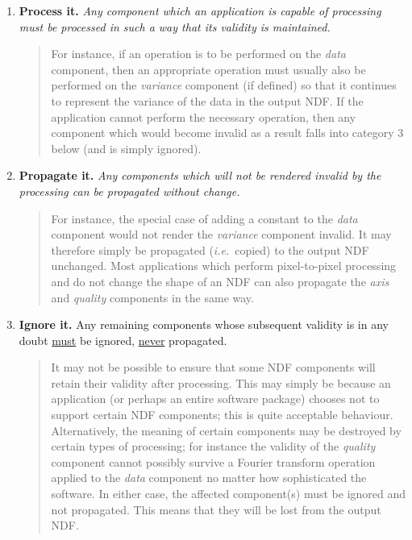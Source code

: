 \documentclass[twoside,11pt,nolof]{starlink}
\providecommand{\st}[1]{{\emph{#1}}}
\begin{document}
\begin{enumerate}

\item \textbf{Process it.}
\st{Any component which an application is capable of processing must be
processed in such a way that its validity is maintained.}

\small
\begin{quote}
For instance, if an operation is to be performed on the \st{data\/} component,
then an appropriate operation must usually also be performed on the
\st{variance\/} component (if defined) so that it continues to
represent the variance
of the data in the output NDF.
If the application cannot perform the necessary operation, then any
component which would become invalid as a result falls into category 3
below (and is simply ignored).
\end{quote}
\normalsize

\item \textbf{Propagate it.}
\st{Any components which will not be rendered invalid by the processing
can be propagated without change.}

\small
\begin{quote}
For instance, the special case of adding a constant to the \st{data\/} component
would not render the \st{variance\/} component invalid.
It may therefore simply be propagated (\st{i.e.}\ copied) to the output NDF
unchanged.
Most applications which perform pixel-to-pixel processing and do not change
the shape of an NDF can also propagate the \st{axis\/} and \st{quality\/}
components in the same way.
\end{quote}
\normalsize

\item \textbf{Ignore it.}
{Any remaining components whose subsequent validity is in any doubt
\underline{must} be ignored, \underline{never} propagated.}

\small
\begin{quote}
It may not be possible to ensure that some NDF components will retain their
validity after processing.
This may simply be because an application (or perhaps an entire software
package) chooses not to support certain NDF components; this is quite
acceptable behaviour.
Alternatively, the meaning of certain components may be destroyed by certain
types of processing; for instance the validity of the \st{quality\/} component
cannot possibly survive a Fourier transform operation applied to the \st{data\/}
component no matter how sophisticated the software.
In either case, the affected component(s) must be ignored and not
propagated.
This means that they will be lost from the output NDF.

\end{quote}
\normalsize

\end{enumerate}
\end{document}
